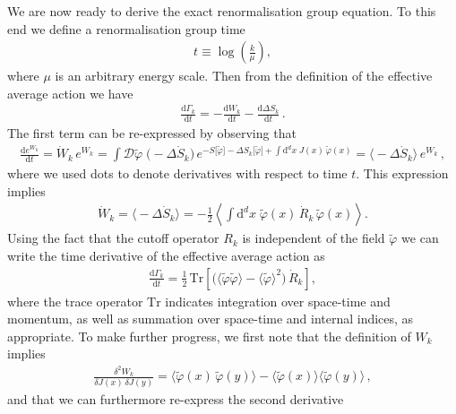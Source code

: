 \documentclass[11pt]{book}
\newcommand{\Tr}{\mathrm{Tr}}
\numberwithin{equation}{chapter}
\begin{document}
We are now ready to derive the exact renormalisation
group equation. To this end we define a renormalisation
group time
\begin{align}
  t \equiv \log \left( \frac k{\mu} \right) ,
\end{align}
where $\mu$ is an arbitrary energy scale. Then from
the definition of the effective average action we
have
\begin{align}
  \frac{ \mathrm d \Gamma_k }{ \mathrm dt }
  = - \frac{ \mathrm d W_k }{ \mathrm dt }
  - \frac{ \mathrm d \Delta S_k }{ \mathrm dt } \,.
\end{align}
The first term can be re-expressed by observing that
\begin{align}
  \frac{ \mathrm d e^{W_k} }{ \mathrm dt }
  = \dot W_k \, e^{W_k}
  = \int \mathcal D \tilde \varphi \;
  \big( - \Delta \dot S_k \big) \,
  e^{
    - S \lbrack \tilde \varphi \rbrack
    - \Delta S_k \lbrack \tilde \varphi \rbrack
    + \int \mathrm d^dx \; J(x) \, \tilde \varphi(x)
  }
  = \big\langle - \Delta \dot S_k \big\rangle \, e^{W_k} \,,
\end{align}
where we used dots to denote derivatives with respect to
time $t$. This expression implies
\begin{align}
  \dot W_k
  = \big\langle - \Delta \dot S_k \big\rangle
  = - \frac 12
  \left\langle
    \int \mathrm d^dx \; \tilde \varphi (x) \, \dot R_k \, \tilde \varphi(x)
  \right\rangle .
\end{align}
Using the fact that the cutoff operator $R_k$ is independent
of the field $\tilde \varphi$ we can write the
time derivative of the effective average action as
\begin{align}
  \frac{ \mathrm d \Gamma_k }{ \mathrm dt }
  = \frac 12 \, \Tr
  \left[
    \big(
      \langle \tilde \varphi \tilde \varphi \rangle
      - \langle \tilde \varphi \rangle ^ 2
    \big)
    \, \dot R_k
  \right] ,
\end{align}
where the trace operator $\Tr$ indicates integration
over space-time and momentum, as well as summation over
space-time and internal indices, as appropriate.
To make further progress, we
first note that the definition of $W_k$ implies
\begin{align}
  \frac{ \delta^2 W_k }{ \delta J(x) \, \delta J(y) }
  =
  \big\langle \tilde \varphi (x) \, \tilde \varphi (y) \big\rangle
  - \big\langle \tilde \varphi (x) \big\rangle \big\langle \tilde \varphi (y) \big\rangle \,,
\end{align}
and that we can furthermore re-express the second derivative
\end{document}
